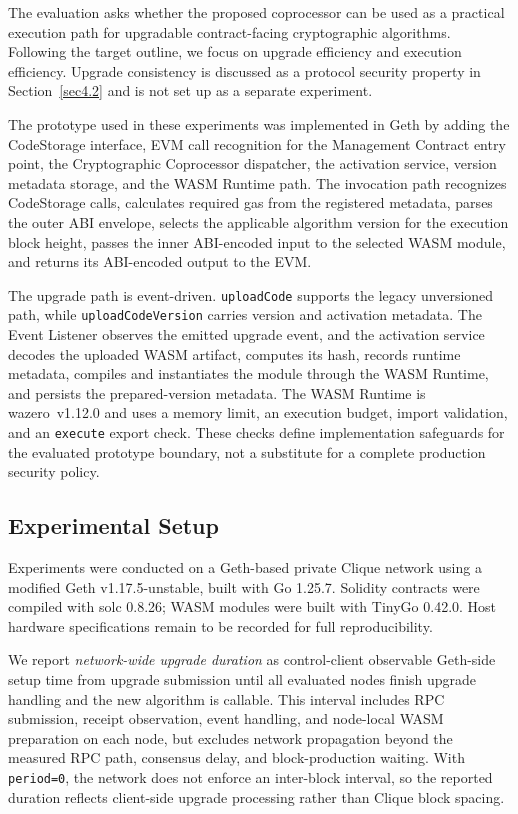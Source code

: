 \documentclass[pdflatex,sn-mathphys-num]{sn-jnl}%
\theoremstyle{thmstyleone}%
\theoremstyle{thmstyletwo}%
\theoremstyle{thmstylethree}%
\begin{document}
The evaluation asks whether the proposed coprocessor can be used as a practical execution path for upgradable contract-facing cryptographic algorithms. Following the target outline, we focus on upgrade efficiency and execution efficiency. Upgrade consistency is discussed as a protocol security property in Section~\ref{sec4.2} and is not set up as a separate experiment.

The prototype used in these experiments was implemented in Geth by adding the CodeStorage interface, EVM call recognition for the Management Contract entry point, the Cryptographic Coprocessor dispatcher, the activation service, version metadata storage, and the WASM Runtime path. The invocation path recognizes CodeStorage calls, calculates required gas from the registered metadata, parses the outer ABI envelope, selects the applicable algorithm version for the execution block height, passes the inner ABI-encoded input to the selected WASM module, and returns its ABI-encoded output to the EVM.

The upgrade path is event-driven. \texttt{uploadCode} supports the legacy unversioned path, while \texttt{uploadCodeVersion} carries version and activation metadata. The Event Listener observes the emitted upgrade event, and the activation service decodes the uploaded WASM artifact, computes its hash, records runtime metadata, compiles and instantiates the module through the WASM Runtime, and persists the prepared-version metadata. The WASM Runtime is wazero~v1.12.0 and uses a memory limit, an execution budget, import validation, and an \texttt{execute} export check. These checks define implementation safeguards for the evaluated prototype boundary, not a substitute for a complete production security policy.

\subsection{Experimental Setup}\label{sec5.1}

Experiments were conducted on a Geth-based private Clique network using a modified Geth v1.17.5-unstable, built with Go 1.25.7. Solidity contracts were compiled with solc 0.8.26; WASM modules were built with TinyGo 0.42.0. Host hardware specifications remain to be recorded for full reproducibility.

We report \emph{network-wide upgrade duration} as control-client observable Geth-side setup time from upgrade submission until all evaluated nodes finish upgrade handling and the new algorithm is callable. This interval includes RPC submission, receipt observation, event handling, and node-local WASM preparation on each node, but excludes network propagation beyond the measured RPC path, consensus delay, and block-production waiting. With \texttt{period=0}, the network does not enforce an inter-block interval, so the reported duration reflects client-side upgrade processing rather than Clique block spacing.
\end{document}
